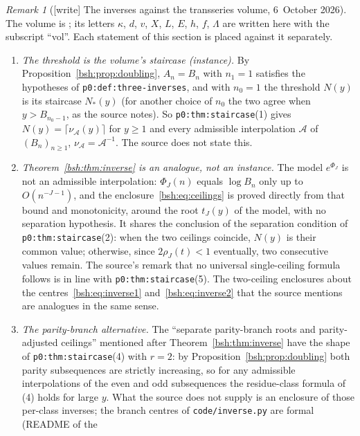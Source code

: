 \documentclass[11pt,letterpaper]{article}
\theoremstyle{remark}\newtheorem{remark}[theorem]{Remark}
\newcommand{\file}[1]{\nolinkurl{#1}}
\begin{document}
\begin{remark}[{[write]} The inverses against the transseries volume, 6~October 2026]\label{bsh:rem:transseries}
The volume is
;
its letters $\kappa$, $d$, $v$, $X$, $L$, $E$, $h$, $f$, $\Lambda$ are
written here with the subscript ``vol''. Each statement of this section is
placed against it separately.
\begin{enumerate}[label=(\alph*)]
\item \emph{The threshold is the volume's staircase (instance).} By
 Proposition~\ref{bsh:prop:doubling}, $A_n=B_n$ with $n_1=1$ satisfies the
 hypotheses of \file{p0:def:three-inverses}, and with $n_0=1$ the threshold
 $N(y)$ is its staircase $N_\ast(y)$ (for another choice of $n_0$ the two
 agree when $y>B_{n_0-1}$, as the source notes). So
 \file{p0:thm:staircase}(1) gives $N(y)=\lceil\nu_{\mathcal A}(y)\rceil$ for
 $y\ge1$ and every admissible interpolation $\mathcal A$ of
 $(B_n)_{n\ge1}$, $\nu_{\mathcal A}=\mathcal A^{-1}$. The source does not
 state this.
\item \emph{Theorem~\ref{bsh:thm:inverse} is an analogue, not an
 instance.} The model $e^{\Phi_J}$ is not an admissible interpolation:
 $\Phi_J(n)$ equals $\log B_n$ only up to $O(n^{-J-1})$, and the
 enclosure~\eqref{bsh:eq:ceilings} is proved directly from that bound and
 monotonicity, around the root $t_J(y)$ of the model, with no separation
 hypothesis. It shares the conclusion of the separation condition of
 \file{p0:thm:staircase}(2): when the two ceilings coincide, $N(y)$ is
 their common value; otherwise, since $2\rho_J(t)<1$ eventually, two
 consecutive values remain. The source's remark that no universal
 single-ceiling formula follows is in line with \file{p0:thm:staircase}(5).
 The two-ceiling enclosures about the centres~\eqref{bsh:eq:inverse1}
 and~\eqref{bsh:eq:inverse2} that the source mentions are analogues in the
 same sense.
\item \emph{The parity-branch alternative.} The ``separate parity-branch
 roots and parity-adjusted ceilings'' mentioned after
 Theorem~\ref{bsh:thm:inverse} have the shape of
 \file{p0:thm:staircase}(4) with $r=2$: by
 Proposition~\ref{bsh:prop:doubling} both parity subsequences are strictly
 increasing, so for any admissible interpolations of the even and odd
 subsequences the residue-class formula of (4) holds for large $y$. What
 the source does not supply is an enclosure of those per-class inverses;
 the branch centres of \file{code/inverse.py} are formal (README of the

\end{enumerate}
\end{remark}
\end{document}
